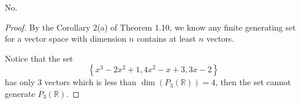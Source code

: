 \begin{Exercise}
\begin{answer}
No.
\end{answer}
\begin{proof}
By the Corollary 2(a) of Theorem 1.10, we know any finite generating set for a vector space with dimension $n$ contains at least $n$ vectors.

Notice that the set
$$
\left\{ x^3-2x^2+1,4x^2-x+3,3x-2 \right\}
$$
has only $3$ vectors which is less than $\dim\left(P_3(\mathbb{R})\right) = 4$, then the set cannot generate $P_3(\mathbb{R})$. 
\end{proof}
\end{Exercise}